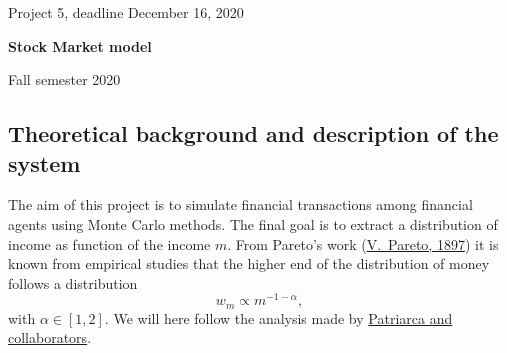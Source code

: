 \documentclass[%
oneside,                 %
final,                   %
10pt]{article}
\begin{document}

\newcommand{\exercisesection}[1]{\subsection*{#1}}






\thispagestyle{empty}

\begin{center}
{\LARGE\bf
\begin{spacing}{1.25}
Project 5, deadline  December 16, 2020
\end{spacing}
}
\end{center}


\begin{center}
{\bf Stock Market model${}^{}$} \\ [0mm]
\end{center}

\begin{center}
\end{center}
    

\begin{center}
Fall semester 2020
\end{center}

\vspace{1cm}


\subsection*{Theoretical background and description of the system}

The aim of this project is to simulate financial transactions among financial agents
using Monte Carlo methods. The final goal is to extract a distribution of income  as function
of the income $m$.   From Pareto's work (\href{{http://www.institutcoppet.org/2012/05/08/cours-deconomie-politique-1896-de-vilfredo-pareto}}{V.~Pareto, 1897}) it is known from empirical studies
that the higher end of the distribution of money follows a distribution 
\[
w_m\propto m^{-1-\alpha},
\]
with $\alpha\in [1,2]$. We will here follow the analysis made by \href{{http://www.sciencedirect.com/science/article/pii/S0378437104004327}}{Patriarca and collaborators}. 
\end{document}
